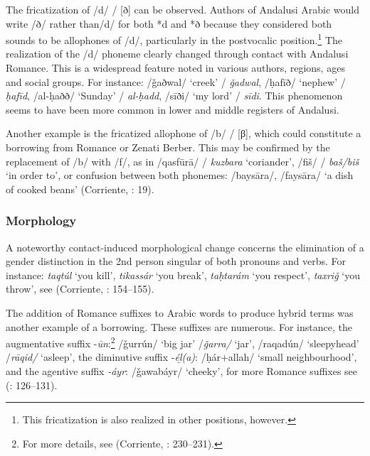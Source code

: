 \documentclass[output=paper,modfonts,nonflat]{langsci/langscibook}
\begin{document}
The fricatization of /d/ / [ð] can be observed. Authors of Andalusi Arabic would write {} /ð/ rather than{}/d/ for both *d and *ð because they considered both sounds to be allophones of /d/, particularly in the postvocalic position.\footnote{This fricatization is also realized in other positions, however.}  The realization of the /d/ phoneme clearly changed through contact with Andalusi Romance. This is a widespread feature noted in various authors, regions, ages and social groups. For instance: {} /ǧaðwal/ ‘creek’ / \textit{ǧadwal}, {} /ḥafīð/ ‘nephew’ / \textit{ḥafīd}, { } /al-ḥaðð/ ‘Sunday’ / \textit{al-ḥadd}, {} /sīði/ ‘my lord’ / \textit{sīdi}. This phenomenon seems to have been more common in lower and middle registers of Andalusi. 

Another example is the fricatized allophone of /b/ / [β], which could constitute a borrowing from Romance or Zenati Berber. This may be confirmed by the replacement of /b/ with /f/, as in /qasfūrā/ / \textit{kuzbara} ‘coriander’, /fiš/ / \textit{baš/biš} ‘in order to’, or confusion between both phonemes: /baysāra/, /faysāra/ ‘a dish of cooked beans’ (Corriente, \citealt{PereiraVicente2015}: 19).
 

\subsubsection{Morphology}




A noteworthy contact-induced morphological change concerns the elimination of a gender distinction in the 2nd person singular of both pronouns and verbs. For instance: \textit{taqtúl} ‘you kill’, \textit{tikassár} ‘you break’, \textit{taḥtarám} ‘you respect’, \textit{taxriǧ} ‘you throw’, see (Corriente, \citealt{PereiraVicente2015}: 154–155).

The addition of Romance suffixes to Arabic words to produce hybrid terms was another example of a borrowing. These suffixes are numerous. For instance, the augmentative suffix -\textit{ūn}:\footnote{For more details, see (Corriente, \citealt{PereiraVicente2015}: 230–231).} /ǧurrún/ ‘big jar’ /\textit{ǧarra/} ‘jar’, /raqadún/ ‘sleepyhead’ /\textit{rāqid/} ‘asleep’, the diminutive suffix -\textit{éḻ(a)}: /ḥár+allah/ ‘small neighbourhood’, and the agentive suffix \textit{-áyr}: /ǧawabáyr/ ‘cheeky’, for more Romance suffixes see (\citealt{Corriente1992}: 126–131). 
\end{document}
